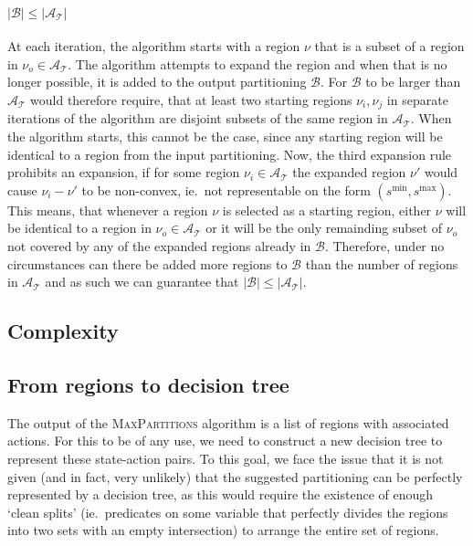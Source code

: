 \paragraph{$|\mathcal{B}| \leq |\mathcal{A}_{\mathcal{T}}|$} At each iteration,
the algorithm starts with a region $\nu$ that is a subset of a region in
$\nu_{o} \in \mathcal{A}_{\mathcal{T}}$. The algorithm attempts to expand the region and
when that is no longer possible, it is added to the output partitioning
$\mathcal{B}$. For $\mathcal{B}$ to be larger than $\mathcal{A}_{\mathcal{T}}$
would therefore require, that at least two starting regions $\nu_{i},
\nu_{j}$ in separate iterations of the algorithm are disjoint subsets of the
same region in $\mathcal{A}_{\mathcal{T}}$. When the algorithm starts, this
cannot be the case, since any starting region will be identical to a region from
the input partitioning. Now, the third expansion rule prohibits an expansion, if
for some region $\nu_{i} \in \mathcal{A}_{\mathcal{T}}$ the expanded region
$\nu'$ would cause $\nu_{i} - \nu'$ to be non-convex, ie.\ not representable on
the form $(s^{\min}, s^{\max})$. This means, that whenever a region $\nu$ is
selected as a starting region, either $\nu$ will be identical to a region in
$\nu_{o} \in \mathcal{A}_{\mathcal{T}}$ or it will be the only remainding subset
of $\nu_{o}$ not covered by any of the expanded regions already in
$\mathcal{B}$. Therefore, under no circumstances can there be added more regions
to $\mathcal{B}$ than the number of regions in $\mathcal{A}_{\mathcal{T}}$ and
as such we can guarantee that $|\mathcal{B}| \leq |\mathcal{A}_{\mathcal{T}}|$.

\subsection{Complexity}%
\label{sec:complexity}

\subsection{From regions to decision tree}%
\label{sub:regionsToDT}

The output of the \textsc{MaxPartitions} algorithm is a list of regions with
associated actions. For this to be of any use, we need to construct a new
decision tree to represent these state-action pairs. To this goal, we face the
issue that it is not given (and in fact, very unlikely) that the suggested
partitioning can be perfectly represented by a decision tree, as this would
require the existence of enough `clean splits' (ie.\ predicates on some variable
that perfectly divides the regions into two sets with an empty intersection) to
arrange the entire set of regions.

